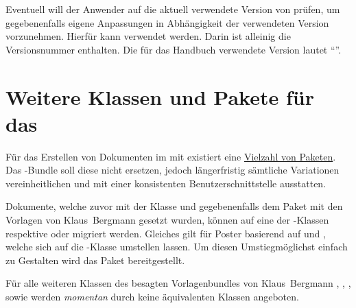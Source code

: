 \begin{Entity}{}
\begin{Declaration}
\begin{Declaration}
Eventuell will der Anwender auf die aktuell verwendete Version von \TUDScript 
prüfen, um gegebenenfalls eigene Anpassungen in Abhängigkeit der verwendeten 
Version vorzunehmen. Hierfür kann  verwendet 
werden. Darin ist alleinig die Versionsnummer enthalten. Die für das Handbuch 
verwendete Version lautet \enquote{\TUDScriptVersionNumber}.
\end{Declaration}
\end{Declaration}
\end{Entity}



\section{Weitere Klassen und Pakete für das \CD}

Für das Erstellen von Dokumenten im \TUDCD mit  existiert eine 
\href{https://tu-dresden.de/cd/vorlagen/druck/latex}{Vielzahl von Paketen}. 
Das \TUDScript-Bundle soll diese nicht ersetzen, jedoch längerfristig sämtliche 
Variationen vereinheitlichen und mit einer konsistenten Benutzerschnittstelle 
ausstatten. 

Dokumente, welche zuvor mit der Klasse  und gegebenenfalls dem 
Paket  mit den Vorlagen von Klaus~Bergmann gesetzt wurden, 
können auf eine der \TUDScript-Klassen  respektive 
 oder  migriert werden. Gleiches gilt für 
Poster basierend auf  und , welche sich
auf die \TUDScript-Klasse  umstellen lassen. Um diesen 
Umstiegmöglichst einfach zu Gestalten wird das Paket  
bereitgestellt.

Für alle weiteren Klassen des besagten Vorlagenbundles von Klaus~Bergmann
, , ,  sowie
 werden \emph{momentan} durch \TUDScript keine äquivalenten 
Klassen angeboten.

